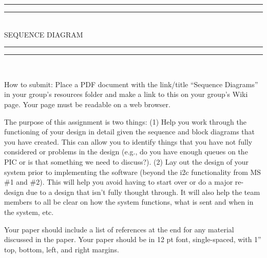 
\begin{titlepage}

\centering
\vspace*{\baselineskip}

\rule{\textwidth}{1.6pt}\vspace*{-\baselineskip}\vspace*{2pt}
\rule{\textwidth}{0.4pt}\\[\baselineskip]

{\LARGE SEQUENCE DIAGRAM}\\[0.2\baselineskip]

\rule{\textwidth}{0.4pt}\vspace*{-\baselineskip}\vspace{3.2pt}
\rule{\textwidth}{1.6pt}\\[\baselineskip]

\wl

\scshape
{\small How to submit: Place a PDF document with the link/title ``Sequence Diagrams'' in your group's resources folder and make a link to this on your group's Wiki page. Your page must be readable on a web browser.

The purpose of this assignment is two things:
(1) Help you work through the functioning of your design in detail given the sequence and block diagrams that you have created.  This can allow you to identify things that you have not fully considered or problems in the design (e.g., do you have enough queues on the PIC or is that something we need to discuss?).
(2) Lay out the design of your system prior to implementing the software (beyond the i2c functionality from MS \#1 and \#2).  This will help you avoid having to start over or do a major re-design due to a design that isn't fully thought through.  It will also help the team members to all be clear on how the system functions, what is sent and when in the system, etc.
 
Your paper should include a list of references at the end for any material discussed in the paper. Your paper should be in 12 pt font, single-spaced, with 1'' top, bottom, left, and right margins.
\\[\baselineskip]\par}


\end{titlepage}
